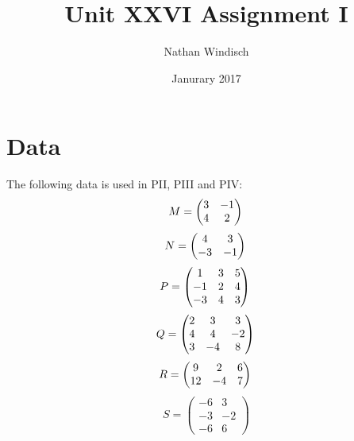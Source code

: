 \documentclass[a4paper,12pt]{article}
\begin{document}
\title{Unit XXVI Assignment I}
\author{Nathan Windisch}
\date{Janurary 2017}
\maketitle
{}
\tableofcontents
\newpage

  \section{Data}
    The following data is used in PII, PIII and PIV:
    \begin{equation}
      M =
      \begin{pmatrix}
        3 & -1\\
        4 &  2
      \end{pmatrix}
      \\
    \end{equation}
    \begin{equation}
      N =
      \begin{pmatrix}
         4 &  3\\
        -3 & -1
      \end{pmatrix}
      \\
    \end{equation}
    \begin{equation}
      P =
      \begin{pmatrix}
        1 & 3 & 5\\
        -1 & 2 & 4\\
        -3 & 4 & 3
      \end{pmatrix}
      \\
    \end{equation}
    \begin{equation}
      Q =
      \begin{pmatrix}
        2 &  3 &  3\\
        4 &  4 & -2\\
        3 & -4 &  8
      \end{pmatrix}
      \\
    \end{equation}
    \begin{equation}
      R =
      \begin{pmatrix}
         9 &  2 & 6\\
        12 & -4 & 7
      \end{pmatrix}
      \\
    \end{equation}
    \begin{equation}
      S =
      \begin{pmatrix}
        -6 &  3\\
        -3 & -2\\
        -6 &  6
      \end{pmatrix}
    \end{equation}
\end{document}

